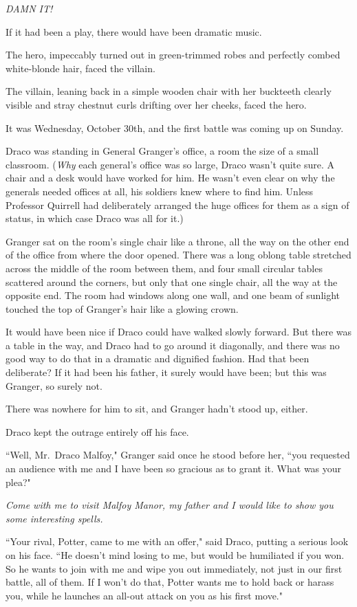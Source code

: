 \emph{DAMN IT!}

\later

If it had been a play, there would have been dramatic music.

The hero, impeccably turned out in green-trimmed robes and perfectly combed white-blonde hair, faced the villain.

The villain, leaning back in a simple wooden chair with her buckteeth clearly visible and stray chestnut curls drifting over her cheeks, faced the hero.

It was Wednesday, October 30th, and the first battle was coming up on Sunday.

Draco was standing in General Granger's office, a room the size of a small classroom. (\emph{Why} each general's office was so large, Draco wasn't quite sure. A chair and a desk would have worked for him. He wasn't even clear on why the generals needed offices at all, his soldiers knew where to find him. Unless Professor Quirrell had deliberately arranged the huge offices for them as a sign of status, in which case Draco was all for it.)

Granger sat on the room's single chair like a throne, all the way on the other end of the office from where the door opened. There was a long oblong table stretched across the middle of the room between them, and four small circular tables scattered around the corners, but only that one single chair, all the way at the opposite end. The room had windows along one wall, and one beam of sunlight touched the top of Granger's hair like a glowing crown.

It would have been nice if Draco could have walked slowly forward. But there was a table in the way, and Draco had to go around it diagonally, and there was no good way to do that in a dramatic and dignified fashion. Had that been deliberate? If it had been his father, it surely would have been; but this was Granger, so surely not.

There was nowhere for him to sit, and Granger hadn't stood up, either.

Draco kept the outrage entirely off his face.

``Well, Mr.~Draco Malfoy," Granger said once he stood before her, ``you requested an audience with me and I have been so gracious as to grant it. What was your plea?"

\emph{Come with me to visit Malfoy Manor, my father and I would like to show you some interesting spells.}

``Your rival, Potter, came to me with an offer," said Draco, putting a serious look on his face. ``He doesn't mind losing to me, but would be humiliated if you won. So he wants to join with me and wipe you out immediately, not just in our first battle, all of them. If I won't do that, Potter wants me to hold back or harass you, while he launches an all-out attack on you as his first move."

